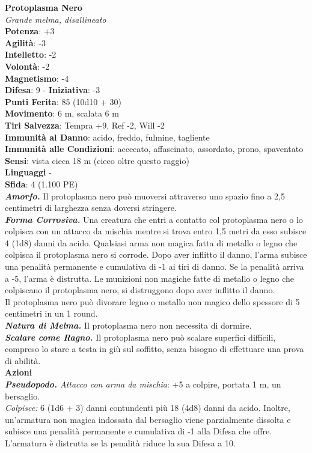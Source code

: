 \begin{multicols}{2}
\medskip\textbf{Protoplasma Nero}\\
\emph{Grande melma, disallineato}\\
\textbf{Potenza}: +3\\
\textbf{Agilità}: -3\\
\textbf{Intelletto}: -2\\
\textbf{Volontà}: -2\\
\textbf{Magnetismo}: -4\\
\textbf{Difesa}: 9 - \textbf{Iniziativa}: -3\\
\textbf{Punti Ferita}: 85 (10d10 + 30)\\
\textbf{Movimento}: 6 m, scalata 6 m\\
\textbf{Tiri Salvezza}: Tempra +9, Ref -2, Will -2\\
\textbf{Immunità al Danno}: acido, freddo, fulmine, tagliente\\
\textbf{Immunità alle Condizioni}: accecato, affascinato, assordato, prono, spaventato
\textbf{Sensi}: vista cieca 18 m (cieco oltre questo raggio)\\
\textbf{Linguaggi} -\\
\textbf{Sfida}: 4 (1.100 PE)\smallskip\\
\emph{\textbf{Amorfo.}} Il protoplasma nero può muoversi attraverso uno spazio fino a 2,5 centimetri di larghezza senza doversi stringere.\\
\emph{\textbf{Forma Corrosiva.}} Una creatura che entri a contatto col protoplasma nero o lo colpisca con un attacco da mischia mentre si trova entro 1,5 metri da esso subisce 4 (1d8) danni da acido. Qualsiasi arma non magica fatta di metallo o legno che colpisca il protoplasma nero si corrode. Dopo aver inflitto il danno, l'arma subisce una penalità permanente e cumulativa di -1 ai tiri di danno. Se la penalità arriva a -5, l'arma è distrutta. Le munizioni non magiche fatte di metallo o legno che colpiscano il protoplasma nero, si distruggono dopo aver inflitto il danno. \\
Il protoplasma nero può divorare legno o metallo non magico dello spessore di 5 centimetri in un 1 round.\\
\emph{\textbf{Natura di Melma.}} Il protoplasma nero non necessita di dormire.\\
\emph{\textbf{Scalare come Ragno.}} Il protoplasma nero può scalare superfici difficili, compreso lo stare a testa in giù sul soffitto, senza bisogno di effettuare una prova di abilità.\\
\smallskip\textbf{Azioni}\\
\emph{\textbf{Pseudopodo.} Attacco con arma da mischia}: +5 a colpire, portata 1 m, un bersaglio.\\
\emph{Colpisce:} 6 (1d6 + 3) danni contundenti più 18 (4d8) danni da acido. Inoltre, un'armatura non magica indossata dal bersaglio viene parzialmente dissolta e subisce una penalità permanente e cumulativa di -1 alla Difesa che offre. L'armatura è distrutta se la penalità riduce la sua Difesa a 10.\\


\end{multicols}
